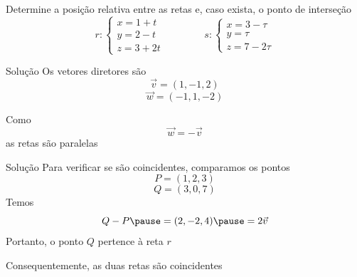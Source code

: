 \begin{question}
  Determine a posição relativa entre as retas e, caso exista, o ponto de interseção
  \[
    r\colon
    \begin{cases}
      x = 1 +  t  \\
      y = 2 -  t  \\
      z = 3 + 2t
    \end{cases}
  \qquad\qquad
    s\colon
    \begin{cases}
      x = 3 - \tau \\
      y =     \tau \\
      z = 7 -2\tau
    \end{cases}
  \]
\end{question}

\begin{resolution}{Solução}
  Os vetores diretores são
  \[
    \vec{v} = (1, -1, 2)
  \]
  \[
    \vec{w} = (-1, 1, -2)
  \]

  \pause
  Como
  \[
    \vec{w} = -\vec{v}
  \]
  \pause
  as retas são paralelas
\end{resolution}

\begin{resolution}{Solução}
  Para verificar se são coincidentes,
  \pause
  comparamos os pontos
  \[
    P = (1, 2, 3)
  \]
  \[
    Q = (3, 0, 7)
  \]
  \pause
  Temos
  \[
    Q - P
    \pause
    = (2, -2, 4)
    \pause
    = 2\vec{v}
  \]
  \pause
  Portanto, o ponto $Q$ pertence à reta $r$

  \pause
  Consequentemente, as duas retas são coincidentes
\end{resolution}

\endinput
